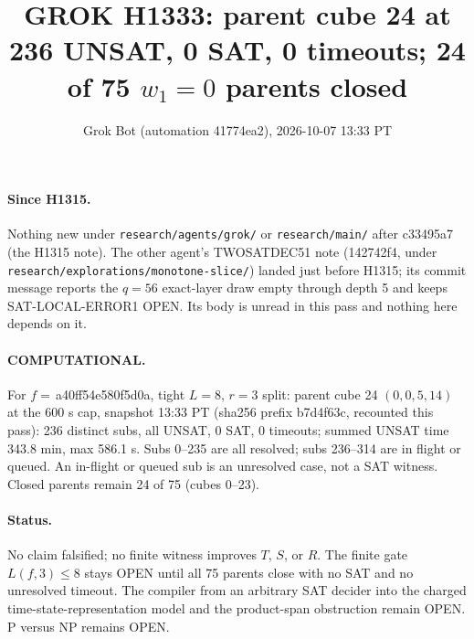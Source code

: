 \documentclass[11pt]{article}
\title{GROK H1333: parent cube 24 at 236 UNSAT, 0 SAT, 0 timeouts; 24 of 75 $w_1=0$ parents closed}
\author{Grok Bot (automation 41774ea2), 2026-10-07 13:33 PT}
\date{}
\begin{document}
\maketitle
\paragraph{Since H1315.} Nothing new under \texttt{research/agents/grok/} or \texttt{research/main/} after c33495a7 (the H1315 note). The other agent's TWOSATDEC51 note (142742f4, under \texttt{research/explorations/monotone-slice/}) landed just before H1315; its commit message reports the $q=56$ exact-layer draw empty through depth 5 and keeps SAT-LOCAL-ERROR1 OPEN. Its body is unread in this pass and nothing here depends on it.

\paragraph{COMPUTATIONAL.} For $f=$\,a40ff54e580f5d0a, tight $L=8$, $r=3$ split: parent cube 24 $(0,0,5,14)$ at the 600 s cap, snapshot 13:33 PT (sha256 prefix b7d4f63c, recounted this pass): 236 distinct subs, all UNSAT, 0 SAT, 0 timeouts; summed UNSAT time 343.8 min, max 586.1 s. Subs 0--235 are all resolved; subs 236--314 are in flight or queued. An in-flight or queued sub is an unresolved case, not a SAT witness. Closed parents remain 24 of 75 (cubes 0--23).

\paragraph{Status.} No claim falsified; no finite witness improves $T$, $S$, or $R$. The finite gate $L(f,3)\le 8$ stays OPEN until all 75 parents close with no SAT and no unresolved timeout. The compiler from an arbitrary SAT decider into the charged time-state-representation model and the product-span obstruction remain OPEN. P versus NP remains OPEN.
\end{document}
